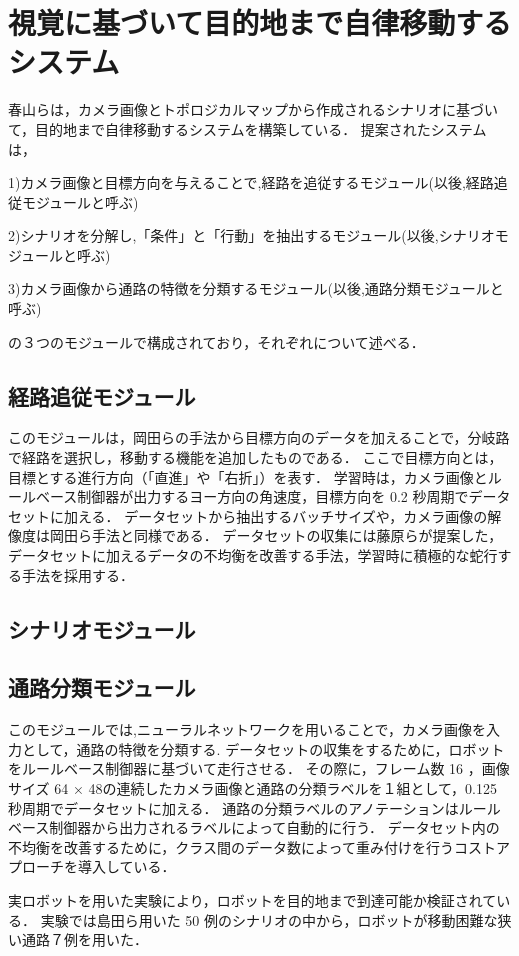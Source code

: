 \section{視覚に基づいて目的地まで自律移動するシステム}
春山らは，カメラ画像とトポロジカルマップから作成されるシナリオに基づいて，目的地まで自律移動するシステムを構築している．
提案されたシステムは，

1)カメラ画像と目標方向を与えることで,経路を追従するモジュール(以後,経路追従モジュールと呼ぶ)

2)シナリオを分解し,「条件」と「行動」を抽出するモジュール(以後,シナリオモジュールと呼ぶ)

3)カメラ画像から通路の特徴を分類するモジュール(以後,通路分類モジュールと呼ぶ)

の３つのモジュールで構成されており，それぞれについて述べる．
\subsection{経路追従モジュール}
このモジュールは，岡田らの手法から目標方向のデータを加えることで，分岐路で経路を選択し，移動する機能を追加したものである．
ここで目標方向とは，目標とする進行方向（「直進」や「右折」）を表す．
学習時は，カメラ画像とルールベース制御器が出力するヨー方向の角速度，目標方向を 0.2 秒周期でデータセットに加える．
データセットから抽出するバッチサイズや，カメラ画像の解像度は岡田ら手法と同様である．
データセットの収集には藤原らが提案した，データセットに加えるデータの不均衡を改善する手法，学習時に積極的な蛇行する手法を採用する．
\subsection{シナリオモジュール}
\subsection{通路分類モジュール}
このモジュールでは,ニューラルネットワークを用いることで，カメラ画像を入力として，通路の特徴を分類する.
データセットの収集をするために，ロボットをルールベース制御器に基づいて走行させる．
その際に，フレーム数 16 ，画像サイズ 64 × 48の連続したカメラ画像と通路の分類ラベルを１組として，0.125 秒周期でデータセットに加える．
通路の分類ラベルのアノテーションはルールベース制御器から出力されるラベルによって自動的に行う．
データセット内の不均衡を改善するために，クラス間のデータ数によって重み付けを行うコストアプローチを導入している．

実ロボットを用いた実験により，ロボットを目的地まで到達可能か検証されている．
実験では島田ら用いた 50 例のシナリオの中から，ロボットが移動困難な狭い通路７例を用いた．